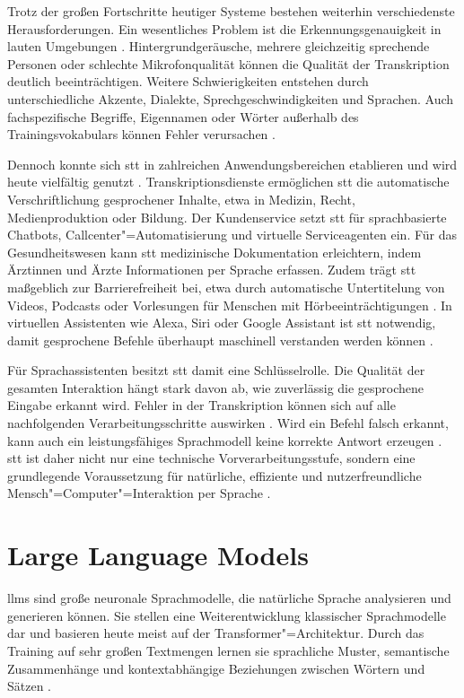 Trotz der großen Fortschritte heutiger Systeme bestehen weiterhin verschiedenste Herausforderungen. Ein wesentliches Problem ist die Erkennungsgenauigkeit in lauten Umgebungen \autocite{voiceassistantIntroduction}. Hintergrundgeräusche, mehrere gleichzeitig sprechende Personen oder schlechte Mikrofonqualität können die Qualität der Transkription deutlich beeinträchtigen. Weitere Schwierigkeiten entstehen durch unterschiedliche Akzente, Dialekte, Sprechgeschwindigkeiten und Sprachen. Auch fachspezifische Begriffe, Eigennamen oder Wörter außerhalb des Trainingsvokabulars können Fehler verursachen \autocite{voiceassistantIntroduction, speechtoTextTexttoSpeechRecognition}.

Dennoch konnte sich \gls{stt} in zahlreichen Anwendungsbereichen etablieren und wird heute vielfältig genutzt \autocite{speechtoTextTexttoSpeechRecognition,EDPBLeitlinienSprachassistenzsysteme,voiceassistantIntroduction}. Transkriptionsdienste ermöglichen \gls{stt} die automatische Verschriftlichung gesprochener Inhalte, etwa in Medizin, Recht, Medienproduktion oder Bildung. Der Kundenservice setzt \gls{stt} für sprachbasierte Chatbots, Callcenter"=Automatisierung und virtuelle Serviceagenten ein. Für das Gesundheitswesen kann \gls{stt} medizinische Dokumentation erleichtern, indem Ärztinnen und Ärzte Informationen per Sprache erfassen. Zudem trägt \gls{stt} maßgeblich zur Barrierefreiheit bei, etwa durch automatische Untertitelung von Videos, Podcasts oder Vorlesungen für Menschen mit Hörbeeinträchtigungen \autocite{speechtoTextTexttoSpeechRecognition}. In virtuellen Assistenten wie Alexa, Siri oder Google Assistant ist \gls{stt} notwendig, damit gesprochene Befehle überhaupt maschinell verstanden werden können \autocite{voiceassistantIntroduction}.

Für Sprachassistenten besitzt \gls{stt} damit eine Schlüsselrolle. Die Qualität der gesamten Interaktion hängt stark davon ab, wie zuverlässig die gesprochene Eingabe erkannt wird. Fehler in der Transkription können sich auf alle nachfolgenden Verarbeitungsschritte auswirken \autocite{speechtoTextTexttoSpeechRecognition}. Wird ein Befehl falsch erkannt, kann auch ein leistungsfähiges Sprachmodell keine korrekte Antwort erzeugen \autocite{comprehensiveOverviewLLM}. \gls{stt} ist daher nicht nur eine technische Vorverarbeitungsstufe, sondern eine grundlegende Voraussetzung für natürliche, effiziente und nutzerfreundliche Mensch"=Computer"=Interaktion per Sprache \autocite{voiceassistantIntroduction}.


\section{Large Language Models}
\label{sec:Large_Language_Models}
\glspl{llm} sind große neuronale Sprachmodelle, die natürliche Sprache analysieren und generieren können. Sie stellen eine Weiterentwicklung klassischer Sprachmodelle dar und basieren heute meist auf der Transformer"=Architektur. Durch das Training auf sehr großen Textmengen lernen sie sprachliche Muster, semantische Zusammenhänge und kontextabhängige Beziehungen zwischen Wörtern und Sätzen \autocite{comprehensiveOverviewLLM}.

